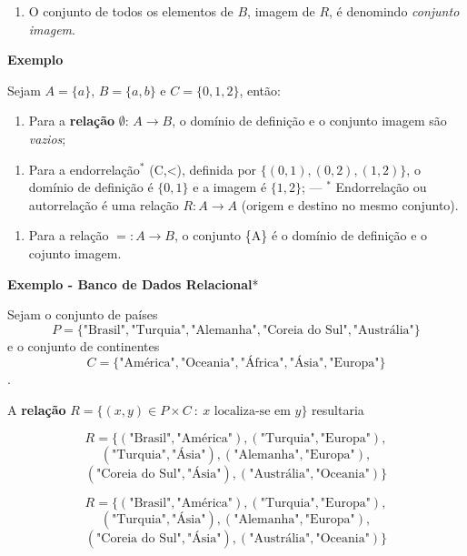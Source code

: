     \begin{enumerate}
\def\labelenumi{\arabic{enumi})}
\setcounter{enumi}{2}
\item
  O conjunto de todos os elementos de \(B\), imagem de \(R\), é
  denomindo \emph{conjunto imagem}.
\end{enumerate}

    \textbf{Exemplo}

Sejam \(A=\{a\}\), \(B=\{a,b\}\) e \(C=\{0,1,2\}\), então:

    \begin{enumerate}
\def\labelenumi{\arabic{enumi})}
\item
  Para a \textbf{relação} \(\emptyset\): \(A\rightarrow B\), o domínio
  de definição e o conjunto imagem são \emph{vazios};
\end{enumerate}

    \begin{enumerate}
\def\labelenumi{\arabic{enumi})}
\setcounter{enumi}{1}
\item
  Para a endorrelação\(^*\) (C,\textless), definida por
  \(\{(0,1),(0,2),(1,2)\}\), o domínio de definição é \(\{0,1\}\) e a
  imagem é \(\{1,2\}\); --- \(^*\) Endorrelação ou autorrelação é uma
  relação \(R:A\rightarrow A\) (origem e destino no mesmo conjunto).
\end{enumerate}

    \begin{enumerate}
\def\labelenumi{\arabic{enumi})}
\setcounter{enumi}{2}
\item
  Para a relação \(=: A\rightarrow B\), o conjunto \{A\} é o domínio de
  definição e o cojunto imagem.
\end{enumerate}

    \textbf{Exemplo - Banco de Dados Relacional}*

Sejam o conjunto de países
\[P=\{\text{"Brasil"},\text{"Turquia"},\text{"Alemanha"}, \text{"Coreia do Sul"},\text{"Austrália"}\}\]
e o conjunto de continentes
\[C=\{\text{"América"},\text{"Oceania"}, \text{"África"},\text{"Ásia"}, \text{"Europa"}\}\].

A \textbf{relação}
\(R=\{(x,y)\in P\times C\ :\ x\text{ localiza-se em }y\}\) resultaria

\[R=\{(\text{"Brasil"},\text{"América"}),(\text{"Turquia"},\text{"Europa"}),\]
\[(\text{"Turquia"},\text{"Ásia"}),(\text{"Alemanha"},\text{"Europa"}),\]
\[(\text{"Coreia do Sul"},\text{"Ásia"}),(\text{"Austrália"},\text{"Oceania"})\}\]

    \[R=\{(\text{"Brasil"},\text{"América"}),(\text{"Turquia"},\text{"Europa"}),\]
\[(\text{"Turquia"},\text{"Ásia"}),(\text{"Alemanha"},\text{"Europa"}),\]
\[(\text{"Coreia do Sul"},\text{"Ásia"}),(\text{"Austrália"},\text{"Oceania"})\}\]

